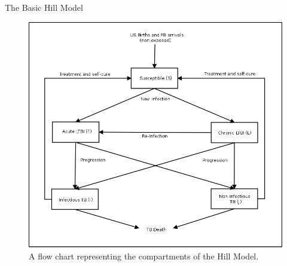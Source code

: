 \documentclass[final]{beamer}
\begin{document}
\begin{frame}
\begin{columns}
\begin{column}{.3\textwidth}
      \begin{block}{The Basic Hill Model}
        \begin{block}{}
            \begin{figure}[h]
              \begin{center}
                \includegraphics[scale=.75]{HillModelFlowChart}
              \end{center}
              \caption{A flow chart representing the compartments of the Hill
                       Model.}
              \label{fig:hillFlow}
            \end{figure}
        \end{block}
            

\end{block}
\end{column}
\end{columns}
\end{frame}
\end{document}

